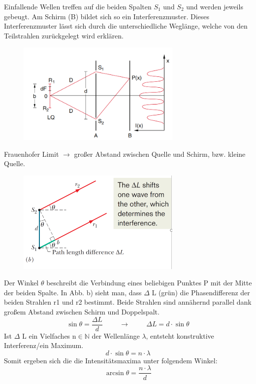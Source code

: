 \documentclass[a4paper, 11pt, parskip=half]{scrartcl}
\begin{document}
Einfallende Wellen treffen auf die beiden Spalten $S_1$ und $S_2$ und werden jeweils gebeugt. Am Schirm (B) bildet sich so ein Interferenzmuster. 
Dieses Interferenzmuster lässt sich durch die unterschiedliche Weglänge, welche von den Teilstrahlen zurückgelegt wird erklären.
\begin{figure}[H]
    \centering
    \includegraphics[width=8cm]{image/18_Interferenz/Youngscher_Doppelspalt.png}
\end{figure}
Frauenhofer Limit $\rightarrow$ großer Abstand zwischen Quelle und Schirm, bzw. kleine Quelle.
\begin{figure}[H]
    \centering
    \includegraphics[width=8cm]{image/18_Interferenz/Doppelspalt_Wegunterschied.png}
\end{figure}
Der Winkel $\theta$ beschreibt die Verbindung eines beliebigen Punktes P mit der Mitte der beiden Spalte. 
In Abb. b) sieht man, dass $\Delta$ L (grün) die Phasendifferenz der beiden Strahlen r1 und r2 bestimmt. Beide 
Strahlen sind annähernd parallel dank großem Abstand zwischen Schirm und Doppelspalt. 
\[\sin \theta = \frac{\Delta L}{d} \hspace{1cm} \rightarrow \hspace{1cm} \Delta L = d \cdot \sin \theta\]
Ist $\Delta$ L ein Vielfaches n$\in\mathbb{N}$ der Wellenlänge $\lambda$, entsteht konstruktive Interferenz/ein Maximum.
\[d \cdot \sin \theta = n \cdot \lambda\]
Somit ergeben sich die die Intensitätsmaxima unter folgendem Winkel:
\begin{equation}
    \label{eq:Intensitaetsmaxima_Young_Doppelspalt}
    \arcsin \theta = \frac{n \cdot \lambda}{d}
\end{equation}
\end{document}
